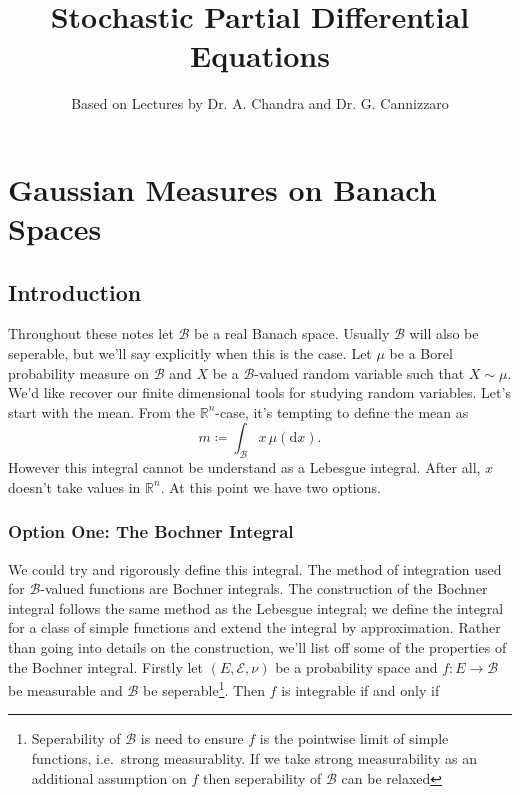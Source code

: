 \documentclass[fontsize=12pt, DIV=10]{scrreprt}
\title{Stochastic Partial Differential Equations}
\author{Based on Lectures by Dr. A. Chandra and Dr. G. Cannizzaro}
\theoremstyle{remark}
\newcommand{\defeq}{\coloneqq}
\newcommand{\R}{\mathbb R}
\newcommand{\calB}{\mathcal B}
\newcommand{\calE}{\mathcal E}
\newcommand{\dif}[1]{\text{d} #1}
\begin{document}
\maketitle

\tableofcontents

\chapter{Gaussian Measures on Banach Spaces}

\section{Introduction}

Throughout these notes let $\calB$ be a real Banach space. Usually $\calB$ will also be seperable, but we'll say explicitly when this is the case. Let $\mu$ be a Borel probability measure on $\calB$ and $X$ be a $\calB$-valued random variable such that $X \sim \mu$. We'd like recover our finite dimensional tools for studying random variables. Let's start with the mean. From the $\R^n$-case, it's tempting to define the mean as
\begin{equation}
	m \defeq \int_{\calB} x \, \mu(\dif x).
\end{equation}
However this integral cannot be understand as a Lebesgue integral. After all, $x$ doesn't take values in $\R^n$. At this point we have two options.

\subsection{Option One: The Bochner Integral}

We could try and rigorously define this integral. The method of integration used for $\calB$-valued functions are Bochner integrals. The construction of the Bochner integral follows the same method as the Lebesgue integral; we define the integral for a class of simple functions and extend the integral by approximation. Rather than going into details on the construction, we'll list off some of the properties of the Bochner integral. Firstly let $(E, \calE, \nu)$ be a probability space and $f: E \to \calB$ be measurable and $\calB$ be seperable\footnote{Seperability of $\calB$ is need to ensure $f$ is the pointwise limit of simple functions, i.e.\ strong measurablity. If we take strong measurability as an additional assumption on $f$ then seperability of $\calB$ can be relaxed}. Then $f$ is integrable if and only if
\end{document}
